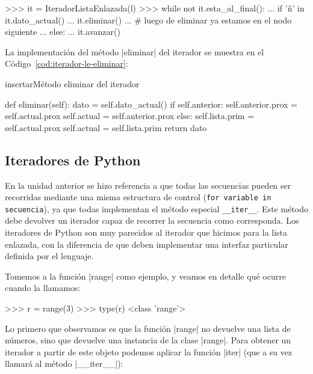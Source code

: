 \begin{codigo-python-sn}
>>> it = IteradorListaEnlazada(l)
>>> while not it.esta_al_final():
...     if 'ñ' in it.dato_actual()
...         it.eliminar()
...         # luego de eliminar ya estamos en el nodo siguiente
...     else:
...         it.avanzar()
\end{codigo-python-sn}

La implementación del método |eliminar| del iterador se muestra en el
Código~\ref{cod:iterador-le-eliminar}:

\begin{codigo}{insertar}{Método eliminar del iterador}
\label{cod:iterador-le-eliminar}
\begin{codigo-python}
    def eliminar(self):
        dato = self.dato_actual()
        if self.anterior:
            self.anterior.prox = self.actual.prox
            self.actual = self.anterior.prox
        else:
            self.lista.prim = self.actual.prox
            self.actual = self.lista.prim
        return dato
\end{codigo-python}
\end{codigo}

\subsection{Iteradores de Python}

En la unidad anterior se hizo referencia a que todas las secuencias
pueden ser recorridas mediante una misma estructura de control
(\lstinline!for variable in secuencia!), ya que todas implementan el método
especial \lstinline!__iter__!.  Este método debe devolver un iterador
capaz de recorrer la secuencia como corresponda. Los iteradores de Python son
muy parecidos al iterador que hicimos para la lista enlazada, con la diferencia
de que deben implementar una interfaz particular definida por el lenguaje.

Tomemos a la función |range| como ejemplo, y veamos en detalle qué ocurre
cuando la llamamos:

\begin{codigo-python-sn}
>>> r = range(3)
>>> type(r)
<class 'range'>
\end{codigo-python-sn}

Lo primero que observamos es que la función |range| no devuelve una lista de
números, sino que devuelve una instancia de la clase |range|. Para obtener un
iterador a partir de este objeto podemos aplicar la función |iter| (que a su
vez llamará al método |__iter__|):

